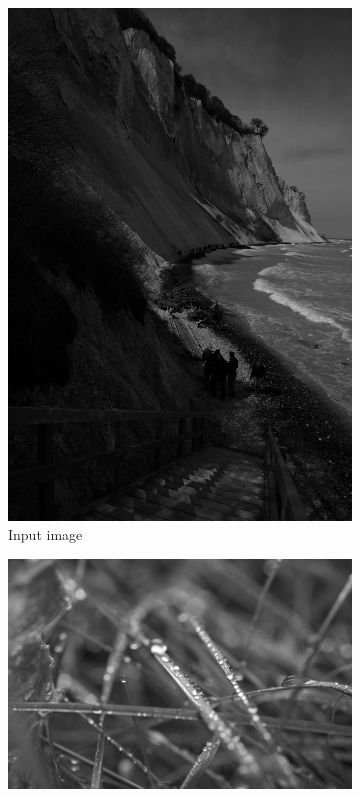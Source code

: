 \documentclass[a4paper]{article}
\begin{document}
\begin{figure}[ht]
        \centering
        \begin{subfigure}[b]{0.3\textwidth}
                \centering
                \includegraphics[width=\textwidth]{q4b-orig.png}
                \caption{Input image}
                \label{fig:be2}
        \end{subfigure}
        \begin{subfigure}[b]{0.3\textwidth}
                \centering
                \includegraphics[width=\textwidth]{q4b-match.png}

\end{subfigure}
\end{figure}
\end{document}
